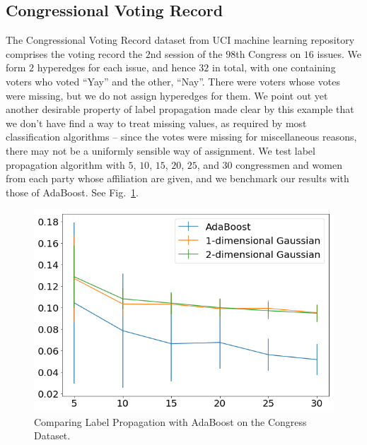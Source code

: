 \documentclass[letterpaper]{article} %
\begin{document}
\subsection{Congressional Voting Record}
The Congressional Voting Record dataset from UCI machine learning repository comprises the voting record the $2$nd session of the $98$th Congress  on $16$ issues. We form $2$ hyperedges for each issue, and hence $32$ in total, with one containing voters who voted ``Yay'' and the other, ``Nay''. There were voters whose votes were missing, but we do not assign hyperedges for them. We point out yet another desirable property of label propagation made clear by this example that we don't have find a way to treat missing values, as required by most classification algorithms -- since the votes were missing for miscellaneous reasons, there may not be a uniformly sensible way of assignment. We test label propagation algorithm with $5$, $10$, $15$, $20$, $25$, and $30$ congressmen and women from each party whose affiliation are given, and we benchmark our results with those of AdaBoost. See Fig.~\ref{fig:lp_vs_AdaBoost_congress}.
\begin{figure}
    \centering
    \includegraphics[scale=.3]{Figures/Congress_labelProp_vs_AdaBoost.png}
    \caption{Comparing Label Propagation with AdaBoost on the Congress Dataset.}
    \label{fig:lp_vs_AdaBoost_congress}
\end{figure}

\end{document}
